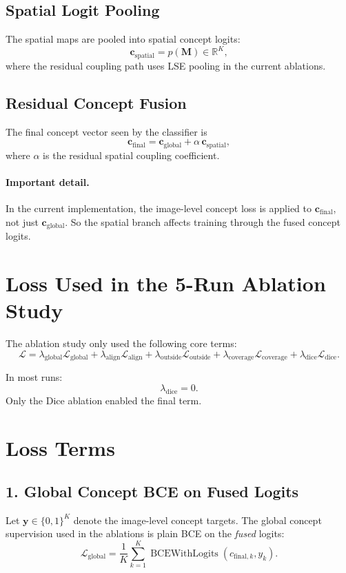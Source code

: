 \documentclass[11pt]{article}
\begin{document}
\subsection{Spatial Logit Pooling}
The spatial maps are pooled into spatial concept logits:
\[
\mathbf{c}_{\mathrm{spatial}} = p(\mathbf{M}) \in \mathbb{R}^{K},
\]
where the residual coupling path uses LSE pooling in the current ablations.

\subsection{Residual Concept Fusion}
The final concept vector seen by the classifier is
\[
\mathbf{c}_{\mathrm{final}}
=
\mathbf{c}_{\mathrm{global}}
+
\alpha \, \mathbf{c}_{\mathrm{spatial}},
\]
where $\alpha$ is the residual spatial coupling coefficient.

\paragraph{Important detail.}
In the current implementation, the image-level concept loss is applied to
$\mathbf{c}_{\mathrm{final}}$, not just $\mathbf{c}_{\mathrm{global}}$.
So the spatial branch affects training through the fused concept logits.

\section{Loss Used in the 5-Run Ablation Study}
The ablation study only used the following core terms:
\[
\mathcal{L}
=
\lambda_{\mathrm{global}} \mathcal{L}_{\mathrm{global}}
+
\lambda_{\mathrm{align}} \mathcal{L}_{\mathrm{align}}
+
\lambda_{\mathrm{outside}} \mathcal{L}_{\mathrm{outside}}
+
\lambda_{\mathrm{coverage}} \mathcal{L}_{\mathrm{coverage}}
+
\lambda_{\mathrm{dice}} \mathcal{L}_{\mathrm{dice}}.
\]

In most runs:
\[
\lambda_{\mathrm{dice}} = 0.
\]
Only the Dice ablation enabled the final term.

\section{Loss Terms}
\subsection{1. Global Concept BCE on Fused Logits}
Let $\mathbf{y} \in \{0,1\}^{K}$ denote the image-level concept targets. The
global concept supervision used in the ablations is plain BCE on the
\emph{fused} logits:
\[
\mathcal{L}_{\mathrm{global}}
=
\frac{1}{K}\sum_{k=1}^{K}
\operatorname{BCEWithLogits}\!\left(c_{\mathrm{final},k}, y_k\right).
\]
\end{document}
